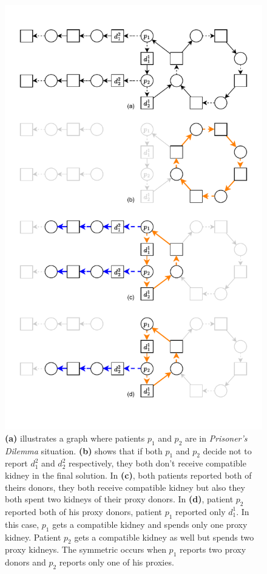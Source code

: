 \begin{figure}
    \centering
    \includegraphics{data/prisoners_dilemma.pdf}
    \caption[Prisoner's dilemma in multiple-donors model]{\textbf{(a)} illustrates a graph where patients $p_1$ and $p_2$ are in \textit{Prisoner's Dilemma} situation. \textbf{(b)} shows that if both $p_1$ and $p_2$ decide not to report $d_1^2$ and $d_2^2$ respectively, they both don't receive compatible kidney in the final solution. In \textbf{(c)}, both patients reported both of theirs donors, they both receive compatible kidney but also they both spent two kidneys of their proxy donors. In \textbf{(d)}, patient $p_2$ reported both of his proxy donors, patient $p_1$ reported only $d_1^1$. In this case, $p_1$ gets a compatible kidney and spends only one proxy kidney. Patient $p_2$ gets a compatible kidney as well but spends two proxy kidneys. The symmetric occurs when $p_1$ reports two proxy donors and $p_2$ reports only one of his proxies.}
    \label{fig:prisoners_dilemma}
\end{figure}

